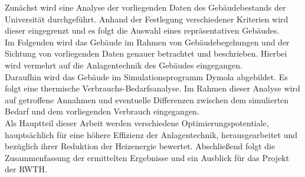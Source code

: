 Zunächst wird eine Analyse der vorliegenden Daten des Gebäudebestands der Universität durchgeführt. Anhand der Festlegung verschiedener Kriterien wird dieser eingegrenzt und es folgt die Auswahl eines repräsentativen Gebäudes. \\
Im Folgenden wird das Gebäude im Rahmen von Gebäudebegehungen und der Sichtung von vorliegenden Daten genauer betrachtet und beschrieben. Hierbei wird vermehrt auf die Anlagentechnik des Gebäudes eingegangen.\\
Daraufhin wird das Gebäude im Simulationsprogramm Dymola abgebildet. Es folgt eine thermische Verbrauchs-Bedarfsanalyse. Im Rahmen dieser Analyse wird auf getroffene Annahmen und eventuelle Differenzen zwischen dem simulierten Bedarf und dem vorliegenden Verbrauch eingegangen. \\
Als Hauptteil dieser Arbeit werden verschiedene Optimierungspotentiale, hauptsächlich für eine höhere Effizienz der Anlagentechnik, herausgearbeitet und bezüglich ihrer Reduktion der Heizenergie bewertet. 
Abschließend folgt die Zusammenfassung der ermittelten Ergebnisse und ein Ausblick für das Projekt der RWTH. 


